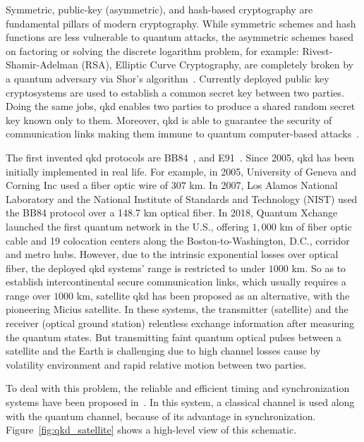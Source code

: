 Symmetric, public-key (asymmetric), and hash-based cryptography are fundamental pillars of modern cryptography. While  symmetric schemes and hash functions are less vulnerable to quantum attacks, the asymmetric schemes based on factoring or solving the discrete logarithm problem, for example: Rivest-Shamir-Adelman (RSA), Elliptic Curve Cryptography, are completely broken by a quantum adversary via Shor's algorithm~\cite{shor1999polynomial}. Currently deployed public key cryptosystems are used to establish a common secret key between two parties. Doing the same jobs, \gls{qkd} enables two parties to produce a shared random secret key known only to them. Moreover, \gls{qkd} is able to guarantee the security of communication links making them immune to quantum computer-based attacks~\cite{gheorghiu2019benchmarking}. 

The first invented \gls{qkd} protocols are BB84~\cite{bennett1984quantum}, and E91~\cite{ekert1992quantum}. Since 2005, \gls{qkd} has been initially implemented in real life. For example, in 2005, University of Geneva and Corning Inc used a fiber optic wire of $307$ km. In 2007, Los Alamos National Laboratory and the National Institute of Standards and Technology (NIST) used the BB84 protocol over a 148.7 km optical fiber. In 2018, Quantum Xchange launched the first quantum network in the U.S., offering $1,000$ km of fiber optic cable and 19 colocation centers along the Boston-to-Washington, D.C., corridor and metro hubs. However, due to the intrinsic exponential losses over optical fiber, the deployed \gls{qkd} systems' range is restricted to under $1000$ km. So as to establish intercontinental secure communication links, which usually requires a range over $1000$ km, satellite \gls{qkd} has been proposed as an alternative, with the pioneering Micius satellite. In these systems, the transmitter (satellite) and the receiver (optical ground station) relentless exchange information after measuring the quantum states. But transmitting faint quantum optical pulses between a satellite and the Earth is challenging due to high channel losses cause by volatility environment and rapid relative motion between two parties. 

To deal with this problem, the reliable and efficient timing and synchronization systems have been proposed in~\cite{khader2018time,duan2021survey}. In this system, a classical channel is used along with the quantum channel, because of its advantage in synchronization. Figure~\ref{fig:qkd_satellite} shows a high-level view of this schematic.

